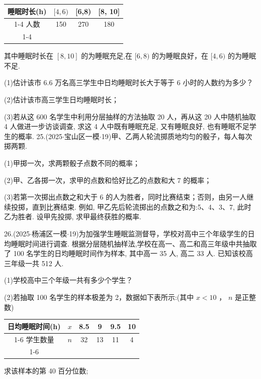 \begin{center}

\begin{tabular}{|c|c|c|c|}
\hline
睡眠时长(h) & $\lbrack 4,6)$ & [6,8) & [8, 10] \\
\cline{1-4}
人数 & 150 & 270 & 180 \\
\cline{1-4}
\hline
\end{tabular}
\end{center}

其中睡眠时长在 $\left\lbrack  {8,{10}}\right\rbrack$ 的为睡眠充足,在 $\lbrack 6,8)$ 的为睡眠良好，在 $\lbrack 4,6)$ 的为睡眠不足.

(1)估计该市 6.6 万名高三学生中日均睡眠时长大于等于 6 小时的人数约为多少？

(2)估计该市高三学生日均睡眠时长；

(3)若从这 600 名学生中利用分层抽样的方法抽取 20 人，再从这 20 人中随机抽取 4 人做进一步访谈调查, 求这 4 人中既有睡眠充足, 又有睡眠良好, 也有睡眠不足学生的概率. 25.(2025$\cdot$宝山区一模$\cdot$19)甲、乙两人轮流掷质地均匀的骰子，每人每次掷两颗.

(1)甲掷一次，求两颗骰子点数不同的概率；

(2)甲、乙各掷一次，求甲的点数和恰好比乙的点数和大 7 的概率；

(3)若第一次掷出点数之和大于 6 的人为胜者，同时比赛结束；否则，由另一人继续投掷，直到比赛结束. 例如, 甲乙先后轮流掷出的点数之和为:5、4、3、7, 此时乙为胜者. 设甲先投掷, 求甲最终获胜的概率.

26.(2025$\cdot$杨浦区一模$\cdot$19)为加强学生睡眠监测督导，学校对高中三个年级学生的日均睡眠时间进行调查. 根据分层随机抽样法,学校在高一、高二和高三年级中共抽取了 100 名学生的日均睡眠时间作为样本, 其中高一 35 人, 高二 33 人. 已知该校高三年级一共 512 人.

(1)学校高中三个年级一共有多少个学生？

(2)若抽取 100 名学生的样本极差为 2，数据如下表所示:(其中 $x < {10}$ ， $n$ 是正整数)

\begin{center}

\begin{tabular}{|c|c|c|c|c|c|}
\hline
日均睡眠时间(h) & $x$ & 8.5 & 9 & 9.5 & 10 \\
\cline{1-6}
学生数量 & $n$ & 32 & 13 & 11 & 4 \\
\cline{1-6}
\hline
\end{tabular}
\end{center}

求该样本的第 40 百分位数;

